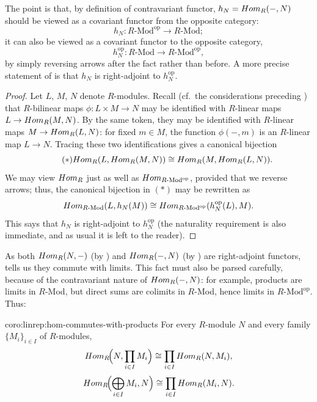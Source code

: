 The point is that, by definition of contravariant functor,
$h_N = Hom_R(-, N)$ should be viewed as a covariant functor from the
opposite category:
\[
  h_N : R\text{-Mod}^{\mathrm{op}} \to R\text{-Mod};
\]
it can also be viewed as a covariant functor to the opposite category,
\[
  h_N^{\mathrm{op}} : R\text{-Mod} \to R\text{-Mod}^{\mathrm{op}},
\]
by simply reversing arrows after the fact rather than before. A more
precise statement of  is that $h_N$ is
right-adjoint to $h_N^{\mathrm{op}}$.

\begin{proof}
  Let $L$, $M$, $N$ denote $R$-modules. Recall (cf.\ the
  considerations preceding ) that $R$-bilinear
  maps $\phi : L \times M \to N$ may be identified with $R$-linear
  maps $L \to Hom_R(M, N)$. By the same token, they may be identified
  with $R$-linear maps $M \to Hom_R(L, N)$: for fixed $m \in M$, the
  function $\phi(-, m)$ is an $R$-linear map $L \to N$. Tracing these
  two identifications gives a canonical bijection
  \begin{equation}
    \tag{$*$}
    Hom_R(L, Hom_R(M, N)) \cong
    Hom_R(M, Hom_R(L, N)).
  \end{equation}
  We may view $Hom_R$ just as well as
  $Hom_{R\text{-Mod}^{\mathrm{op}}}$, provided that we reverse
  arrows; thus, the canonical bijection in $(*)$ may be rewritten as
  \[
    Hom_{R\text{-Mod}}(L, h_N(M)) \cong
    Hom_{R\text{-Mod}^{\mathrm{op}}}(h_N^{\mathrm{op}}(L), M).
  \]
  This says that $h_N$ is right-adjoint to $h_N^{\mathrm{op}}$ (the
  naturality requirement is also immediate, and as usual it is left to
  the reader).
\end{proof}

As both $Hom_R(N, -)$ (by ) and
$Hom_R(-, N)$ (by ) are right-adjoint
functors,  tells us they commute with
limits. This fact must also be parsed carefully, because of the
contravariant nature of $Hom_R(-, N)$: for example, products are
limits in $R$-Mod, but direct sums are colimits in $R$-Mod, hence
limits in $R\text{-Mod}^{\mathrm{op}}$. Thus:

\begin{coro}{}{coro:linrep:hom-commutes-with-products}
  For every $R$-module $N$ and every family $\{M_i\}_{i \in I}$ of
  $R$-modules,
  \[
    Hom_R\!\Bigl(N, \prod_{i \in I} M_i\Bigr) \cong \prod_{i \in I}
    Hom_R(N, M_i),
  \]
  \[
    Hom_R\!\Bigl(\bigoplus_{i \in I} M_i, N\Bigr) \cong \prod_{i \in
      I} Hom_R(M_i, N).
  \]
\end{coro}

